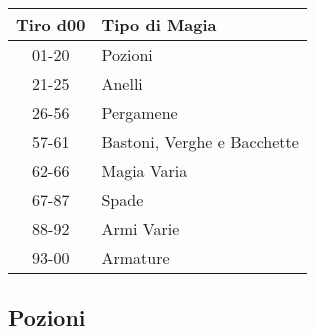 \documentclass{article}
\begin{document}
\begin{multicols}{2}
\begin{table}[h]
\centering
\begin{tabular}{|c|l|}
\hline
\textbf{Tiro d00} & \textbf{Tipo di Magia} \\
\hline
01-20 & Pozioni \\
21-25 & Anelli \\
26-56 & Pergamene \\
57-61 & Bastoni, Verghe e Bacchette \\
62-66 & Magia Varia \\
67-87 & Spade \\
88-92 & Armi Varie \\
93-00 & Armature \\
\hline
\end{tabular}

\end{table}

\subsection{Pozioni}


\end{multicols}
\end{document}
